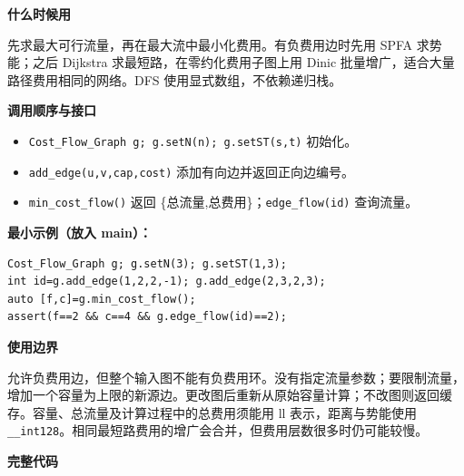 \documentclass[UTF8,a4paper,10pt]{ctexart}
\newcommand{\TemplUsage}[1]{\textbf{什么时候用}\par #1\par}
\newcommand{\TemplApi}[1]{\textbf{调用顺序与接口}\par #1\par}
\newcommand{\TemplNote}[1]{\textbf{使用边界}\par #1\par}
\begin{document}
\TemplUsage{先求最大可行流量，再在最大流中最小化费用。有负费用边时先用 SPFA 求势能；之后 Dijkstra 求最短路，在零约化费用子图上用 Dinic 批量增广，适合大量路径费用相同的网络。DFS 使用显式数组，不依赖递归栈。}
\TemplApi{\begin{itemize}
\item \texttt{Cost\_Flow\_Graph g; g.setN(n); g.setST(s,t)} 初始化。
\item \texttt{add\_edge(u,v,cap,cost)} 添加有向边并返回正向边编号。
\item \texttt{min\_cost\_flow()} 返回 \{总流量,总费用\}；\texttt{edge\_flow(id)} 查询流量。
\end{itemize}}
\textbf{最小示例（放入 main）：}
\begin{lstlisting}
Cost_Flow_Graph g; g.setN(3); g.setST(1,3);
int id=g.add_edge(1,2,2,-1); g.add_edge(2,3,2,3);
auto [f,c]=g.min_cost_flow();
assert(f==2 && c==4 && g.edge_flow(id)==2);
\end{lstlisting}
\TemplNote{允许负费用边，但整个输入图不能有负费用环。没有指定流量参数；要限制流量，增加一个容量为上限的新源边。更改图后重新从原始容量计算；不改图则返回缓存。容量、总流量及计算过程中的总费用须能用 ll 表示，距离与势能使用 \texttt{\_\_int128}。相同最短路费用的增广会合并，但费用层数很多时仍可能较慢。}
\textbf{完整代码}
\end{document}
